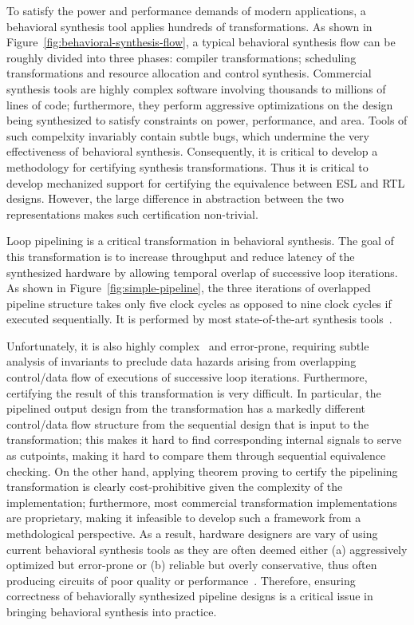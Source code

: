 To satisfy the power and performance demands
of modern applications, a behavioral synthesis tool applies
hundreds of transformations. As shown in Figure~\ref{fig:behavioral-synthesis-flow}, 
a typical behavioral synthesis flow can be roughly divided into three phases: 
compiler transformations; scheduling transformations and 
resource allocation and control synthesis. 
Commercial
synthesis tools are highly complex software involving
thousands to millions of lines of code; furthermore, they
perform aggressive optimizations on the design being
synthesized to satisfy constraints on power, performance,
and area.  Tools of such compelxity invariably contain
subtle bugs, which undermine the very effectiveness of
behavioral synthesis.  Consequently, it is critical to
develop a methodology for certifying synthesis
transformations.
Thus it is critical to develop mechanized support
for certifying the equivalence between ESL and RTL
designs. However, the large difference in
abstraction between the two representations makes such
certification non-trivial.

Loop pipelining is a critical transformation in behavioral
synthesis. The goal of this transformation is to increase
throughput and reduce latency of the synthesized hardware by
allowing temporal overlap of successive loop iterations. 
As shown in Figure~\ref{fig:simple-pipeline}, the three iterations of
overlapped pipeline structure takes only five clock cycles as opposed to 
nine clock cycles if executed sequentially.  It
is performed by most state-of-the-art 
synthesis tools~\cite{forte,vivado,legup}.

Unfortunately, it is also highly complex~\cite{tl:software-popl10} and
error-prone, requiring subtle analysis of invariants to
preclude data hazards arising from overlapping control/data flow of
executions of successive loop iterations.  Furthermore,
certifying the result of this transformation is very
difficult.  In particular, the pipelined output design from
the transformation has a markedly different control/data
flow structure from the sequential design that is input to
the transformation; this makes it hard to find corresponding
internal signals to serve as cutpoints, making it hard to
compare them through sequential equivalence checking.  On
the other hand, applying theorem proving to certify the
pipelining transformation is clearly cost-prohibitive given
the complexity of the implementation; furthermore, most
commercial transformation implementations are proprietary,
making it infeasible to develop such a framework from a
methdological perspective.
As a result, hardware designers are vary of using current behavioral synthesis tools as
they are often deemed either (a) aggressively optimized but error-prone or (b) 
reliable but overly conservative, thus often producing circuits of poor quality
or performance~\cite{spark,kundu2008}. Therefore, ensuring
correctness of behaviorally synthesized pipeline designs
is a critical issue in bringing behavioral synthesis into practice.

